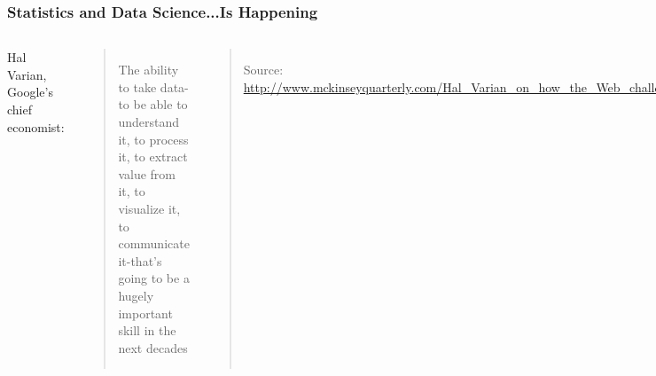 \documentclass[
10pt]{beamer}
\begin{document}
\begin{frame}
\frametitle{Statistics and Data Science...Is Happening}

\begin{columns}[c]
\column{2.0in}

\begin{center}
Hal Varian, Google's chief economist:
\end{center}
\begin{quote}
The ability to take data-to be able to understand it, to process it, to extract value from it, to visualize it, to communicate it-that's going to be a hugely important skill in the next decades
\end{quote}
\vfill
\begin{quote}
{\tiny Source: \url{http://www.mckinseyquarterly.com/Hal_Varian_on_how_the_Web_challenges_managers_2286}}
\end{quote}
\column{3.0in}
\begin{center}
  \includegraphics[width=2.0in]{figs/dilbert_statistician.jpg}\\

\end{center}

\end{columns}

\end{frame}
\end{document}

